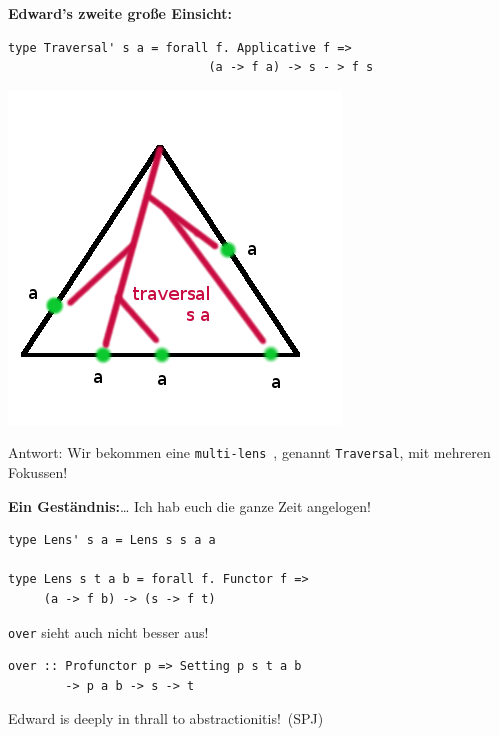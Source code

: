\documentclass{beamer}
\begin{document}

\begin{frame}[fragile]
\textbf{Edward's zweite große Einsicht:}\bigskip

\begin{verbatim}
type Traversal' s a = forall f. Applicative f => 
                            (a -> f a) -> s - > f s
\end{verbatim}

\begin{center}
\includegraphics[scale=0.4]{traversal.png} 
\end{center}

Antwort: Wir bekommen eine \glqq \texttt{multi-lens}\grqq\ , genannt \texttt{Traversal}, mit mehreren Fokussen!

\end{frame}


\begin{frame}[fragile]
\textbf{Ein Geständnis:}\dots\pause
Ich hab euch die ganze Zeit angelogen!\bigskip

\begin{verbatim}
type Lens' s a = Lens s s a a

type Lens s t a b = forall f. Functor f =>
     (a -> f b) -> (s -> f t)
\end{verbatim}
\pause
\bigskip

\texttt{over} sieht auch nicht besser aus!

\begin{verbatim}
over :: Profunctor p => Setting p s t a b
        -> p a b -> s -> t 
\end{verbatim}
\pause
\bigskip

\begin{center}
\glqq Edward is deeply in thrall to abstractionitis!\grqq\ (SPJ)
\end{center}

\end{frame}
\end{document}
